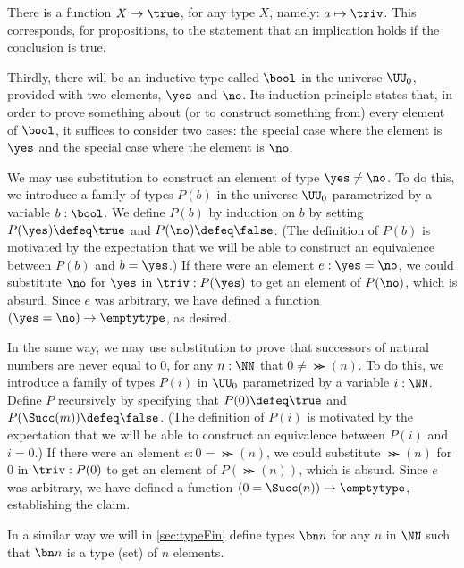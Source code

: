 There is a function $X \to \true$, for any type $X$, namely: $a \mapsto \triv$.  This corresponds, for propositions, to the statement that an
implication holds if the conclusion is true.

Thirdly, there will be an inductive type called $\bool$ in the universe $\UU_0$, provided with two elements, $\yes$ and $\no$.  Its induction
principle states that, in order to prove something about (or to construct something from) every element of $\bool$, it suffices to consider two
cases: the special case where the element is $\yes$ and the special case where the element is $\no$.

We may use substitution to construct an element of type $\yes \ne \no$.  To do this, we introduce a family of types $P(b)$ in the universe
$\UU_0$ parametrized by a variable $b:\bool$.  We define $P(b)$ by induction on $b$ by setting $P(\yes) \defeq \true$ and $P(\no) \defeq
\false$.  (The definition of $P(b)$ is motivated by the expectation that we will be able to construct an equivalence between $P(b)$ and $b =
\yes$.)  If there were an element $e: \yes = \no$, we could substitute $\no$ for $\yes$ in $\triv : P (\yes)$ to get an element of $P(\no)$,
which is absurd.  Since $e$ was arbitrary, we have defined a function $(\yes=\no) \to \emptytype$, as desired.

In the same way, we may use substitution to prove that successors of natural numbers are never equal to $0$, \ie for any $n:\NN$ that $0 \ne
\Succ(n)$.  To do this, we introduce a family of types $P(i)$ in $\UU_0$ parametrized by a variable $i:\NN$.  Define $P$ recursively by
specifying that $P(0) \defeq \true$ and $P(\Succ(m)) \defeq \false$.  (The definition of $P(i)$ is motivated by the expectation that we will be
able to construct an equivalence between $P(i)$ and $i = 0$.)  If there were an element $e: 0 = \Succ(n)$, we could substitute $\Succ(n)$ for $0$
in $\triv : P ( 0 )$ to get an element of $P(\Succ(n))$, which is absurd.  Since $e$ was arbitrary, we have defined a function $(0=\Succ(n)) \to
\emptytype$, establishing the claim.

In a similar way we will in \cref{sec:typeFin} define types $\bn n$ for any $n$ in $\NN$
such that $\bn n$ is a type (set) of $n$ elements.


